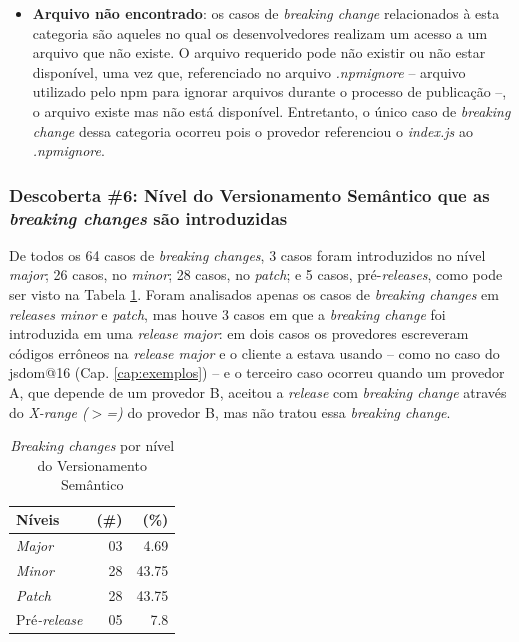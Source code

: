 \begin{itemize}
    \item \textbf{Arquivo não encontrado}: os casos de \textit{breaking change} relacionados à esta categoria são aqueles no qual os desenvolvedores realizam um acesso a um arquivo que não existe. O arquivo requerido pode não existir ou não estar disponível, uma vez que, referenciado no arquivo \textit{.npmignore} -- arquivo utilizado pelo \textsf{npm} para ignorar arquivos durante o processo de publicação --, o arquivo existe mas não está disponível. Entretanto, o único caso de \textit{breaking change} dessa categoria ocorreu pois o provedor referenciou o \textit{index.js} ao \textit{.npmignore}.
\end{itemize}{}

\subsubsection{Descoberta \#6: Nível do Versionamento Semântico que as \textit{breaking changes} são introduzidas}

De todos os 64 casos de \textit{breaking changes}, 3 casos foram introduzidos no nível \textit{major}; 26 casos, no \textit{minor}; 28 casos, no \textit{patch}; e 5 casos, pré-\textit{releases}, como pode ser visto na Tabela \ref{tab:semver_levels}. Foram analisados apenas os casos de \textit{breaking changes} em \textit{releases minor} e \textit{patch}, mas houve 3 casos em que a \textit{breaking change} foi introduzida em uma \textit{release major}: em dois casos os provedores escreveram códigos errôneos na \textit{release major} e o cliente a estava usando -- como no caso do \textsf{jsdom@16} (Cap. \ref{cap:exemplos}) -- e o terceiro caso ocorreu quando um provedor \textsf{A}, que depende de um provedor \textsf{B}, aceitou a \textit{release} com \textit{breaking change} através do \textit{X-range ($>$=)} do provedor \textsf{B}, mas não tratou essa \textit{breaking change}.

\begin{table}
	\centering
	\caption{\textit{Breaking changes} por nível do Versionamento Semântico}
	\begin{tabular}{lrr}
		\toprule
		\textbf{Níveis} & \textbf{(\#)} & \textbf{(\%)} \\ \hline
		\textit{Major}       & 03       & 4.69          \\
		\textit{Minor}       & 28       & 43.75         \\
		\textit{Patch}       & 28       & 43.75         \\
		Pré\textit{-release} & 05       & 7.8           \\ \bottomrule
	\end{tabular}
	\label{tab:semver_levels}
\end{table}

